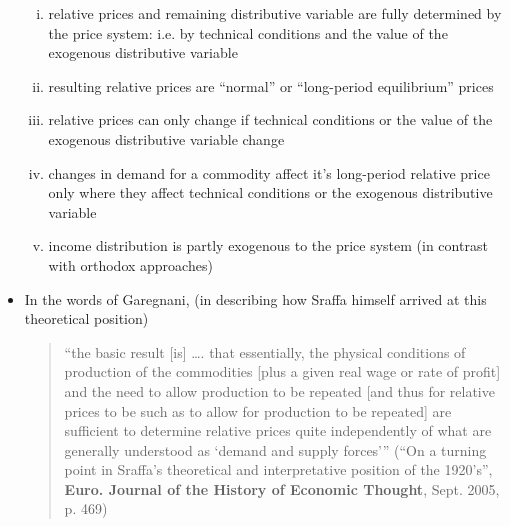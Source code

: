 \documentclass[a4paper,twoside]{article}
\numberwithin{equation}{section}
\numberwithin{figure}{section}
\begin{document}
\begin{itemize}
\begin{enumerate}[(i)]
			\item relative prices and remaining distributive variable are fully determined by the price system: i.e. by technical conditions and the value of the exogenous distributive variable 
			\item resulting relative prices are ``normal'' or ``long-period equilibrium'' prices
			\item relative prices can only change if technical conditions or the value of the exogenous distributive variable change
			\item changes in demand for a commodity affect it's long-period relative price only where they affect technical conditions or the exogenous distributive variable
			\item income distribution is partly exogenous to the price system  (in contrast with orthodox approaches)
		\end{enumerate}
		\item In the words of Garegnani, (in describing how Sraffa himself arrived at this theoretical position)
		\begin{quote}
			“the basic result [is] …. that essentially, the physical conditions of production of the commodities [plus a given real wage or rate of profit] and the need to allow production to be repeated [and thus for relative prices to be such as to allow for production to be repeated] are sufficient to determine relative prices quite independently of what are generally understood as `demand and supply forces'''  (“On a turning point in Sraffa's theoretical and interpretative position of the 1920's'', \textbf{Euro. Journal of the History of Economic Thought}, Sept. 2005, p. 469)
		\end{quote}
	\end{itemize}
\end{document}
